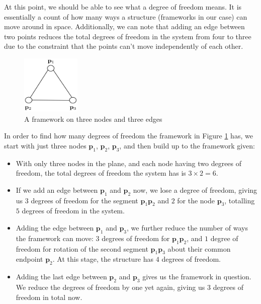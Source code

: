 \begin{flushleft}
At this point, we should be able to see what a degree of freedom means. It is essentially a count of how many ways a structure (frameworks in our case) can move around in space. Additionally, we can note that adding an edge between two points reduces the total degrees of freedom in the system from four to three due to the constraint that the points can't move independently of each other. 
\end{flushleft}
\vspace{-3 mm}
\begin{figure}[htbp]
    \centering
    \includegraphics[width = 0.25\textwidth]{Chapter 3/5. degree_of_freedom.png}
    \caption{A framework on three nodes and three edges}
    \label{fig: degree_of_freedom}
\end{figure}

\begin{example}
In order to find how many degrees of freedom the framework in Figure \ref{fig: degree_of_freedom} has, we start with just three nodes $\mathbf{p}_1$, $\mathbf{p}_2$, $\mathbf{p}_3$, and then build up to the framework given:
\begin{itemize}
    \item With only three nodes in the plane, and each node having two degrees of freedom, the total degrees of freedom the system has is $3 \times 2 = 6$.
    
    \item If we add an edge between $\mathbf{p}_1$ and $\mathbf{p}_2$ now, we lose a degree of freedom, giving us $3$ degrees of freedom for the segment $\mathbf{p}_1\mathbf{p}_2$ and $2$ for the node $\mathbf{p}_3$, totalling $5$ degrees of freedom in the system.
    
    \item Adding the edge between $\mathbf{p}_1$ and $\mathbf{p}_3$, we further reduce the number of ways the framework can move: $3$ degrees of freedom for $\mathbf{p}_1\mathbf{p}_2$, and $1$ degree of freedom for rotation of the second segment $\mathbf{p}_1\mathbf{p}_3$ about their common endpoint $\mathbf{p}_2$. At this stage, the structure has $4$ degrees of freedom.
    
    \item Adding the last edge between $\mathbf{p}_2$ and $\mathbf{p}_3$ gives us the framework in question. We reduce the degrees of freedom by one yet again, giving us $3$ degrees of freedom in total now.
\end{itemize}
\end{example}


